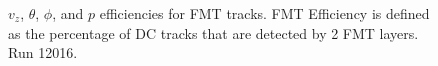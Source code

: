 
    \begin{figure}[t!]
        \centering{}
        \caption[$v_z$, $\theta$, $\phi$, and $p$ efficiencies for FMT tracks, run 12016]{$v_z$, $\theta$, $\phi$, and $p$ efficiencies for FMT tracks. FMT Efficiency is defined as the percentage of DC tracks that are detected by 2 FMT layers. Run 12016.}
        \label{fig::14.14::fmt_efficiencies}
    \end{figure}
